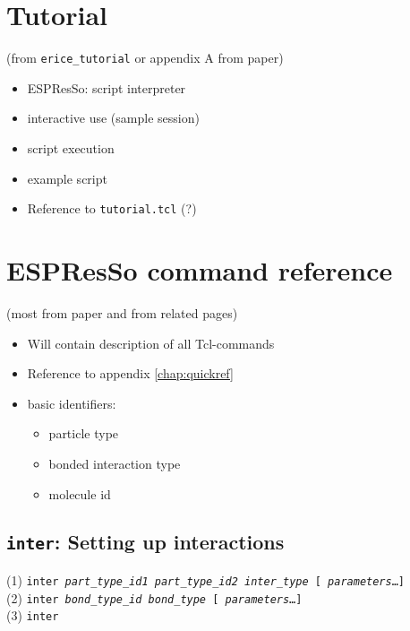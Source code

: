 \documentclass[
a4paper,                        %
11pt,                           %
twoside,                        %
footsepline,                    %
headsepline,                    %
headexclude,                    %
footexclude,                    %
pagesize,                       %
bibtotocnumbered,               %
idxtotoc                        %
]{scrreprt}
\newcommand{\es}{\textsf{ESPResSo}}
\newcommand{\variant}[2]{(#1) \texttt{#2}\\}
\newcommand{\var}[1]{\textrm{\textit{#1}}}
\newenvironment{syntax}{%
  \begin{Sbox}
    \begin{minipage}{0.9\linewidth}
    }{%
    \end{minipage}
  \end{Sbox}
  \begin{center}
    \fbox{\TheSbox}
  \end{center}
}
\begin{document}


\chapter{Tutorial}
\label{chap:tutorial}

(from \verb!erice_tutorial! or appendix A from paper)

\begin{itemize}
\item \es: script interpreter
\item interactive use (sample session)
\item script execution
\item example script
\item Reference to \verb!tutorial.tcl! (?)
\end{itemize}

\chapter{\es{} command reference}
\label{chap:ref}

(most from paper and from related pages)

\begin{itemize}
\item Will contain description of all Tcl-commands
\item Reference to appendix \vref{chap:quickref}
\item basic identifiers:
  \begin{itemize}
  \item particle type
  \item bonded interaction type
  \item molecule id
  \end{itemize}
\end{itemize}


\section{\texttt{inter}: Setting up interactions}
\label{sec:inter}
\begin{syntax}
  \variant{1}
  {inter 
    \var{part\_type\_id1} 
    \var{part\_type\_id2}
    \var{inter\_type} 
    [ \var{parameters}\ldots ]
  }
  \variant{2}
  {inter 
    \var{bond\_type\_id} \var{bond\_type} [
    \var{parameters}\ldots ]
  }
  \variant{3}
  {inter}
\end{syntax}
\end{document}
